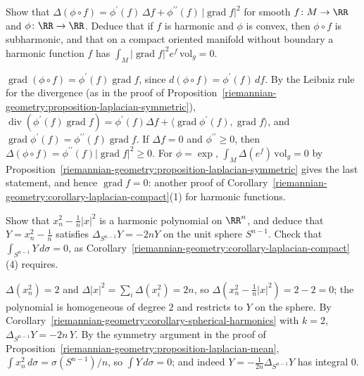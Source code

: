 \begin{exercise}\label{riemannian-geometry:exercise-laplacian-composition}
Show that $\Delta(\phi \circ f) = \phi^{\prime}(f)\,\Delta f + \phi^{\prime\prime}(f)\,|\operatorname{grad}f|^2$ for smooth $f \colon M \to \RR$ and $\phi \colon \RR \to \RR$. Deduce that if $f$ is harmonic and
$\phi$ is convex, then $\phi \circ f$ is subharmonic, and that on a compact oriented manifold without boundary a harmonic function $f$ has $\int_M|\operatorname{grad}f|^2e^{f}\,\mathrm{vol}_g = 0$.
\end{exercise}

\begin{solution}
$\operatorname{grad}(\phi \circ f) = \phi^{\prime}(f)\operatorname{grad}f$, since $d(\phi \circ f) = \phi^{\prime}(f)\,df$. By the Leibniz rule for the divergence
(as in the proof of Proposition~\ref{riemannian-geometry:proposition-laplacian-symmetric}), $\operatorname{div}(\phi^{\prime}(f)\operatorname{grad}f) = \phi^{\prime}(f)\Delta f + \langle\operatorname{grad}\phi^{\prime}(f), \operatorname{grad}f\rangle$, and
$\operatorname{grad}\phi^{\prime}(f) = \phi^{\prime\prime}(f)\operatorname{grad}f$. If $\Delta f = 0$ and $\phi^{\prime\prime} \geq 0$, then $\Delta(\phi \circ f) = \phi^{\prime\prime}(f)|\operatorname{grad}f|^2 \geq 0$. For $\phi = \exp$,
$\int_M\Delta(e^f)\,\mathrm{vol}_g = 0$ by Proposition~\ref{riemannian-geometry:proposition-laplacian-symmetric} gives the last statement, and hence $\operatorname{grad}f = 0$: another proof of
Corollary~\ref{riemannian-geometry:corollary-laplacian-compact}(1) for harmonic functions.
\end{solution}

\begin{exercise}\label{riemannian-geometry:exercise-spherical-harmonic-quadratic}
Show that $x_n^2 - \frac1n|x|^2$ is a harmonic polynomial on $\RR^n$, and deduce that $Y = x_n^2 - \frac1n$ satisfies $\Delta_{S^{n-1}}Y = -2nY$ on the unit sphere $S^{n-1}$. Check that
$\int_{S^{n-1}}Y\,d\sigma = 0$, as Corollary~\ref{riemannian-geometry:corollary-laplacian-compact}(4) requires.
\end{exercise}

\begin{solution}
$\Delta(x_n^2) = 2$ and $\Delta|x|^2 = \sum_i\Delta(x_i^2) = 2n$, so $\Delta(x_n^2 - \frac1n|x|^2) = 2 - 2 = 0$; the polynomial is homogeneous of degree $2$ and restricts to $Y$ on the sphere. By
Corollary~\ref{riemannian-geometry:corollary-spherical-harmonics} with $k = 2$, $\Delta_{S^{n-1}}Y = -2n\,Y$. By the symmetry argument in the proof of
Proposition~\ref{riemannian-geometry:proposition-laplacian-mean}, $\int x_n^2\,d\sigma = \sigma(S^{n-1})/n$, so $\int Y\,d\sigma = 0$; and indeed $Y = -\frac{1}{2n}\Delta_{S^{n-1}}Y$ has integral $0$.
\end{solution}

